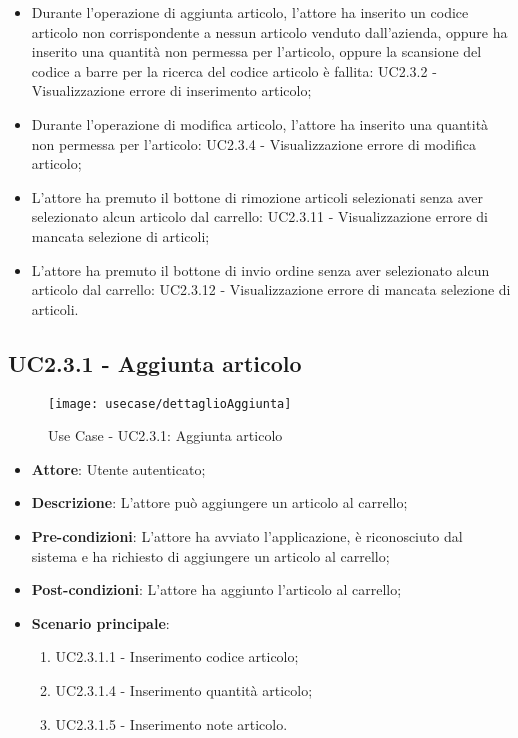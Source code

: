 \begin{itemize}
\begin{itemize}
			\item Durante l'operazione di aggiunta articolo, l'attore ha inserito un codice articolo non corrispondente a nessun articolo venduto dall'azienda, oppure ha inserito una quantità non permessa per l'articolo, oppure la scansione del codice a barre per la ricerca del codice articolo è fallita: UC2.3.2 - Visualizzazione errore di inserimento articolo;
			\item Durante l'operazione di modifica articolo, l'attore ha inserito una quantità non permessa per l'articolo: UC2.3.4 - Visualizzazione errore di modifica articolo;
			\item L'attore ha premuto il bottone di rimozione articoli selezionati senza aver selezionato alcun articolo dal carrello: UC2.3.11 - Visualizzazione errore di mancata selezione di articoli;
			\item L'attore ha premuto il bottone di invio ordine senza aver selezionato alcun articolo dal carrello: UC2.3.12 - Visualizzazione errore di mancata selezione di articoli.
		\end{itemize}
\end{itemize}

\newpage

\subsection{UC2.3.1 - Aggiunta articolo}

\begin{figure}[!h] 
    \centering 
    \texttt{[image: usecase/dettaglioAggiunta]} 
    \caption{Use Case - UC2.3.1: Aggiunta articolo}
\end{figure}

\begin{itemize}
	\item \textbf{Attore}: Utente autenticato;
	\item \textbf{Descrizione}: L'attore può aggiungere un articolo al carrello;
	\item \textbf{Pre-condizioni}: L'attore ha avviato l'applicazione, è riconosciuto dal sistema e ha richiesto di aggiungere un articolo al carrello;
	\item \textbf{Post-condizioni}: L'attore ha aggiunto l'articolo al carrello;
	\item \textbf{Scenario principale}:
		\begin{enumerate}
			\item UC2.3.1.1 - Inserimento codice articolo;
			\item UC2.3.1.4 - Inserimento quantità articolo;
			\item UC2.3.1.5 - Inserimento note articolo.
		\end{enumerate}
\end{itemize}

